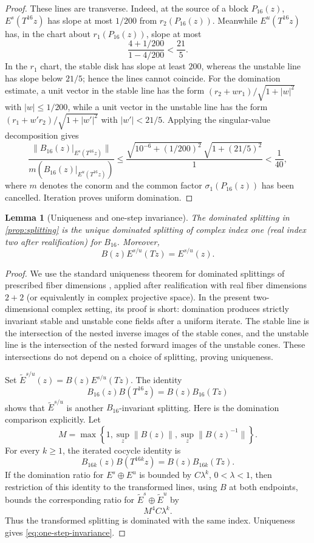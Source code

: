 \documentclass[11pt,reqno]{amsart}
\numberwithin{equation}{section}
\newtheorem{lemma}[theorem]{Lemma}
\theoremstyle{definition}
\newcommand{\norm}[1]{\lVert #1\rVert}
\begin{document}
\begin{proof}
These lines are transverse.  Indeed, at the source of a block $P_{16}(z)$,
$E^s(T^{16}z)$ has slope at most $1/200$ from $r_2(P_{16}(z))$.  Meanwhile
$E^u(T^{16}z)$ has, in the chart about $r_1(P_{16}(z))$, slope at most
\[
 \frac{4+1/200}{1-4/200}<\frac{21}{5}.
\]
In the $r_1$ chart, the stable disk has slope at least $200$, whereas the
unstable line has slope below $21/5$; hence the lines cannot coincide.  For
the domination estimate, a unit vector in the stable line has the form
$(r_2+w r_1)/\sqrt{1+|w|^2}$ with $|w|\le1/200$, while a unit vector in the
unstable line has the form $(r_1+w'r_2)/\sqrt{1+|w'|^2}$ with
$|w'|<21/5$.  Applying the singular-value decomposition gives
\[
 \frac{\norm{B_{16}(z)|_{E^s(T^{16}z)}}}
      {m(B_{16}(z)|_{E^u(T^{16}z)})}
 \le
 \frac{\sqrt{10^{-6}+(1/200)^2}\,
       \sqrt{1+(21/5)^2}}{1}
 <\frac1{40},
\]
where $m$ denotes the conorm and the common factor
$\sigma_1(P_{16}(z))$ has been cancelled.  Iteration proves uniform
domination.
\end{proof}

\begin{lemma}[Uniqueness and one-step invariance]\label{lem:one-step}
The dominated splitting in \cref{prop:splitting} is the unique dominated
splitting of complex index one (real index two after realification) for
$B_{16}$.  Moreover,
\begin{equation}\label{eq:one-step-invariance}
 B(z)E^{s/u}(Tz)=E^{s/u}(z).
\end{equation}
\end{lemma}

\begin{proof}
We use the standard uniqueness theorem for dominated splittings of prescribed
fiber dimensions \cite{BochiGourmelon}, applied after realification with real
fiber dimensions $2+2$ (or equivalently in complex projective space).  In the
present two-dimensional complex setting, its proof is short: domination produces strictly
invariant stable and unstable cone fields after a uniform iterate.  The stable
line is the intersection of the nested inverse images of the stable cones,
and the unstable line is the intersection of the nested forward images of
the unstable cones.  These intersections do not depend on a choice of
splitting, proving uniqueness.

Set $\widetilde E^{s/u}(z)=B(z)E^{s/u}(Tz)$.  The identity
\[
 B_{16}(z)B(T^{16}z)=B(z)B_{16}(Tz)
\]
shows that $\widetilde E^{s/u}$ is another $B_{16}$-invariant splitting.
Here is the domination comparison explicitly.  Let
\[
 M=\max\!\left\{1,\sup_z\norm{B(z)},\sup_z\norm{B(z)^{-1}}\right\}.
\]
For every $k\ge1$, the iterated cocycle identity is
\[
 B_{16k}(z)B(T^{16k}z)=B(z)B_{16k}(Tz).
\]
If the domination ratio for $E^s\oplus E^u$ is bounded by $C\lambda^k$,
$0<\lambda<1$, then restriction of this identity to the transformed lines,
using $B$ at both endpoints, bounds the corresponding ratio for
$\widetilde E^s\oplus\widetilde E^u$ by
\[
 M^4C\lambda^k.
\]
Thus the transformed splitting is dominated with the same index.  Uniqueness
gives \eqref{eq:one-step-invariance}.
\end{proof}
\end{document}
